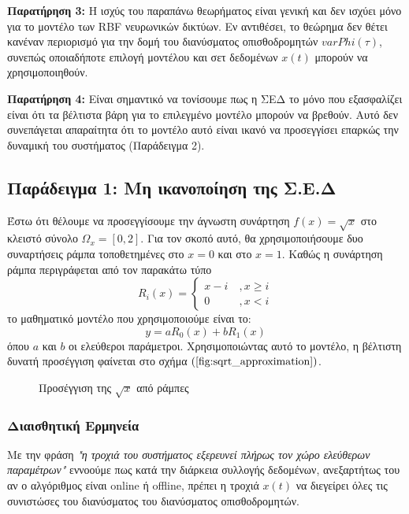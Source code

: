 \textbf{Παρατήρηση 3:} Η ισχύς του παραπάνω θεωρήματος είναι γενική και δεν ισχύει μόνο για το μοντέλο των RBF νευρωνικών δικτύων. Εν αντιθέσει, το θεώρημα δεν θέτει κανέναν περιορισμό για την δομή του διανύσματος οπισθοδρομητών $varPhi(\tau)$, συνεπώς οποιαδήποτε επιλογή μοντέλου και σετ δεδομένων $x(t)$ μπορούν να χρησιμοποιηθούν.

\textbf{Παρατήρηση 4:} Είναι σημαντικό να τονίσουμε πως η ΣΕΔ το μόνο που εξασφαλίζει είναι ότι τα βέλτιστα βάρη για το επιλεγμένο μοντέλο μπορούν να βρεθούν. Αυτό δεν συνεπάγεται απαραίτητα ότι το μοντέλο αυτό είναι ικανό να προσεγγίσει επαρκώς την δυναμική του συστήματος (Παράδειγμα 2).

\subsection{Παράδειγμα 1: Μη ικανοποίηση της Σ.Ε.Δ}
Έστω ότι θέλουμε να προσεγγίσουμε την άγνωστη συνάρτηση $f(x) = \sqrt{x}$ στο κλειστό σύνολο $\Omega_x = [0,2]$. Για τον σκοπό αυτό, θα χρησιμοποιήσουμε δυο συναρτήσεις ράμπα τοποθετημένες στο $x=0$ και στο $x=1$. Καθώς η συνάρτηση ράμπα περιγράφεται από τον παρακάτω τύπο
\begin{equation*}
	R_i(x) = \begin{cases}
	x-i \:&, x \geq i\\
	0 \: &, x<i 
	\end{cases}
\end{equation*}
το μαθηματικό μοντέλο που χρησιμοποιούμε είναι το:
\begin{equation}
y = a R_0(x) + b R_1(x)
\label{eq:ramp_model}
\end{equation}
όπου $a$ και $b$ οι ελεύθεροι παράμετροι. Χρησιμοποιώντας αυτό το μοντέλο, η βέλτιστη δυνατή προσέγγιση φαίνεται στο σχήμα $(\ref{fig:sqrt_approximation})$.

\begin{figure}
	\centering
	\scalebox{1}{}
	\caption{ Προσέγγιση της $\sqrt{x}$ από ράμπες}
	\label{fig:sqrt_approximation}
\end{figure}

\subsubsection{Διαισθητική Ερμηνεία}
Με την φράση \emph{"η τροχιά του συστήματος εξερευνεί πλήρως τον χώρο ελεύθερων παραμέτρων"} εννοούμε πως κατά την διάρκεια συλλογής δεδομένων, ανεξαρτήτως του αν ο αλγόριθμος είναι online ή offline, πρέπει η τροχιά $x(t)$ να διεγείρει όλες τις συνιστώσες του διανύσματος του διανύσματος οπισθοδρομητών.

